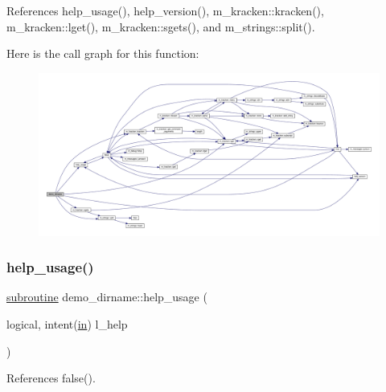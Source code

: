 References help\+\_\+usage(), help\+\_\+version(), m\+\_\+kracken\+::kracken(), m\+\_\+kracken\+::lget(), m\+\_\+kracken\+::sgets(), and m\+\_\+strings\+::split().

Here is the call graph for this function\+:
\nopagebreak
\begin{figure}[H]
\begin{center}
\leavevmode
\includegraphics[width=350pt]{__dirname_8f90_ad38fdec955ba9814439d9492698fd8c4_cgraph}
\end{center}
\end{figure}
\mbox{\label{__dirname_8f90_a3d60364463c9076e431b8d8c043cbd1c}} 
\subsubsection{\texorpdfstring{help\+\_\+usage()}{help\_usage()}}
{\footnotesize\ttfamily \hyperlink{M__stopwatch_83_8txt_acfbcff50169d691ff02d4a123ed70482}{subroutine} demo\+\_\+dirname\+::help\+\_\+usage (\begin{DoxyParamCaption}\item[{logical, intent(\hyperlink{M__journal_83_8txt_afce72651d1eed785a2132bee863b2f38}{in})}]{l\+\_\+help }\end{DoxyParamCaption})}



References false().

